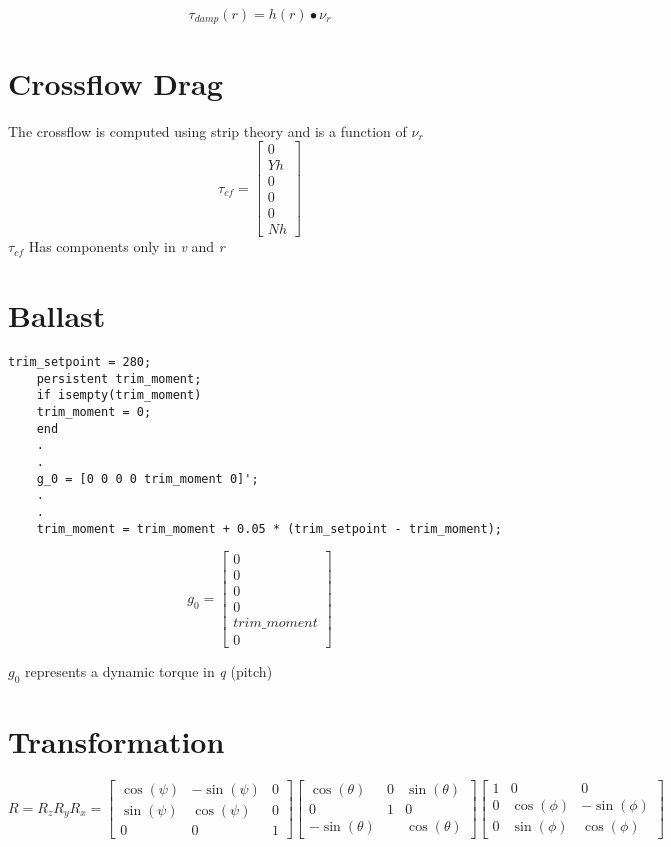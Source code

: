 \documentclass[12pt,a4]{article}
\begin{document}
\begin{equation}
	\tau_{damp}(r) = h(r) \bullet \nu_r
\end{equation}

\section{Crossflow Drag}
The crossflow is computed using strip theory and is a function of $\nu_r$
\begin{equation}
	\tau_{cf} =
	\begin{bmatrix}0\\Yh\\0\\0\\0\\Nh\end{bmatrix}
\end{equation}
$\tau_{cf}$ Has components only in \textit{v} and \textit{r}

\section{Ballast}
\begin{lstlisting}[frame=single]
	trim_setpoint = 280;
	persistent trim_moment;
	if isempty(trim_moment)
	trim_moment = 0;
	end
	.
	.
	g_0 = [0 0 0 0 trim_moment 0]';
	.
	.
	trim_moment = trim_moment + 0.05 * (trim_setpoint - trim_moment);
\end{lstlisting}

\begin{equation}
	g_0 =
	\begin{bmatrix}0\\0\\0\\0\\trim\_moment\\0\end{bmatrix}
\end{equation}

$g_0$ represents a dynamic torque in \textit{q} (pitch)

\section{Transformation}
\begin{equation}
	R = R_z R_y R_x =
	\begin{bmatrix}
		\cos(\psi) & -\sin(\psi) & 0 \\
		\sin(\psi) & \cos(\psi)  & 0 \\
		0          & 0           & 1
	\end{bmatrix}
	\begin{bmatrix}
		\cos(\theta)  & 0 & \sin(\theta) \\
		0             & 1 & 0            \\
		-\sin(\theta) &   & \cos(\theta)
	\end{bmatrix}
	\begin{bmatrix}
		1 & 0          & 0           \\
		0 & \cos(\phi) & -\sin(\phi) \\
		0 & \sin(\phi) & \cos(\phi)
	\end{bmatrix}
\end{equation}
\end{document}

